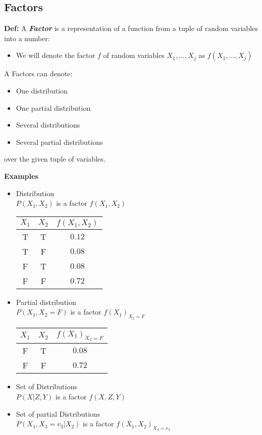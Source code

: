 \documentclass{article}
\begin{document}
\subsection*{Factors}
\textbf{Def:} A \textbf{\textit{Factor}} is a representation of a function from a tuple of random variables into a number:
\begin{itemize}
	\item We will denote the factor $ f $ of random variables $ X_1, \dots, X_j $ as $ f(X_1, \dots, X_j) $
\end{itemize}
A Factors can denote:
\begin{itemize}[label = $ \rightarrow $]
	\item One distribution
	\item One partial distribution
	\item Several distributions
	\item Several partial distributions
\end{itemize}
over the given tuple of variables.
\begin{siderules}
	\textbf{Examples}
	\begin{itemize}
		\item Distribution\\
		$ P(X_1, X_2) $ is a factor $ f(X_1, X_2) $
	\begin{center}
		\begin{tabular}{|c|c|c|}
			\hline
			$ X_1 $ & $ X_2 $ & $  f(X_1, X_2) $\\
			\hline
			T & T & $ 0.12 $ \\
			\hline
			T & F & $ 0.08 $ \\
			\hline
			F & T & $ 0.08 $ \\
			\hline
			F & F & $ 0.72 $ \\
			\hline
		\end{tabular}
	\end{center}

	\item Partial distribution\\
	$ P(X_1, X_2 = F) $ is a factor $ f(X_1)_{X_2 = F} $
	\begin{center}
		\begin{tabular}{|c|c|c|}
			\hline
			$ X_1 $ & $ X_2 $ & $  f(X_1)_{X_2 = F}$\\
			\hline
			F & T & $ 0.08 $ \\
			\hline
			F & F & $ 0.72 $ \\
			\hline
		\end{tabular}
	\end{center}
\item Set of Distributions\\
$ P(X | Z,Y) $ is a factor $ f(X,Z,Y) $
\item Set of partial Distributions\\
$ P(X_1, X_3 = v_3 | X_2) $ is a factor $ f(X_1, X_2)_{X_3 = v_3}  $
	\end{itemize}
	
	\end{siderules}
\end{document}
